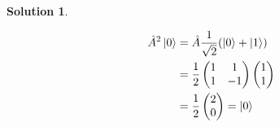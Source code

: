 \documentclass[10pt]{article}
\theoremstyle{definition}
\newtheorem{soln}{Solution}
\begin{document}
\begin{soln}
\begin{enumerate}[label=(\alph*)]
          \begin{align*}
            \hat{A}^2\ket{0} & =\hat{A}\frac{1}{\sqrt{2}}(\ket{0}+\ket{1}) \\
                             & =\frac{1}{2}\begin{pmatrix}
                                             1 & 1  \\
                                             1 & -1
                                           \end{pmatrix}\begin{pmatrix}
                                                          1 \\1
                                                        \end{pmatrix}     \\
                             & =\frac{1}{2}\begin{pmatrix}
                                             2 \\0
                                           \end{pmatrix}=\ket{0}
          \end{align*}
  \end{enumerate}
\end{soln}
\end{document}
